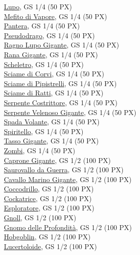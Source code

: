 \begin{multicols}{3}
{\hyperlink{Lupo}{Lupo}, GS 1/4 (50 PX)\\
\hyperlink{Mefito di Vapore}{Mefito di Vapore}, GS 1/4 (50 PX)\\
\hyperlink{Pantera}{Pantera}, GS 1/4 (50 PX)\\
\hyperlink{Pseudodrago}{Pseudodrago}, GS 1/4 (50 PX)\\
\hyperlink{Ragno Lupo Gigante}{Ragno Lupo Gigante}, GS 1/4 (50 PX)\\
\hyperlink{Rana Gigante}{Rana Gigante}, GS 1/4 (50 PX)\\
\hyperlink{Scheletro}{Scheletro}, GS 1/4 (50 PX)\\
\hyperlink{Sciame di Corvi}{Sciame di Corvi}, GS 1/4 (50 PX)\\
\hyperlink{Sciame di Pipistrelli}{Sciame di Pipistrelli}, GS 1/4 (50 PX)\\
\hyperlink{Sciame di Ratti}{Sciame di Ratti}, GS 1/4 (50 PX)\\
\hyperlink{Serpente Costrittore}{Serpente Costrittore}, GS 1/4 (50 PX)\\
\hyperlink{Serpente Velenoso Gigante}{Serpente Velenoso Gigante}, GS 1/4 (50 PX)\\
\hyperlink{Spada Volante}{Spada Volante}, GS 1/4 (50 PX)\\
\hyperlink{Spiritello}{Spiritello}, GS 1/4 (50 PX)\\
\hyperlink{Tasso Gigante}{Tasso Gigante}, GS 1/4 (50 PX)\\
\hyperlink{Zombi}{Zombi}, GS 1/4 (50 PX)\\
\hyperlink{Caprone Gigante}{Caprone Gigante}, GS 1/2 (100 PX)\\
\hyperlink{Saurovallo da Guerra}{Saurovallo da Guerra}, GS 1/2 (100 PX)\\
\hyperlink{Cavallo Marino Gigante}{Cavallo Marino Gigante}, GS 1/2 (100 PX)\\
\hyperlink{Coccodrillo}{Coccodrillo}, GS 1/2 (100 PX)\\
\hyperlink{Cockatrice}{Cockatrice}, GS 1/2 (100 PX)\\
\hyperlink{Esploratore}{Esploratore}, GS 1/2 (100 PX)\\
\hyperlink{Gnoll}{Gnoll}, GS 1/2 (100 PX)\\
\hyperlink{Gnomo delle Profondità}{Gnomo delle Profondità}, GS 1/2 (100 PX)\\
\hyperlink{Hobgoblin}{Hobgoblin}, GS 1/2 (100 PX)\\
\hyperlink{Lucertoloide}{Lucertoloide}, GS 1/2 (100 PX)\\
}
\end{multicols}
